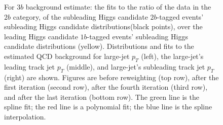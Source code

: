 \begin{figure}[htbp!]
\begin{center}
\caption{For $3b$ background estimate: the fits to the ratio of the data in the $2b$ category, of the subleading Higgs candidate $2b$-tagged events' subleading Higgs candidate distributions(black points), over the leading Higgs candidate $1b$-tagged events' subleading Higgs candidate distributions (yellow). Distributions and fits to the estimated QCD background for large-\R jet $p_{T}$ (left),  the large-\R jet's leading track jet $p_T$ (middle), and large-\R jet's subleading track jet $p_T$ (right) are shown.  Figures are before reweighting (top row), after the first iteration (second row), after the fourth iteration (third row), and after the last iteration (bottom row). The green line is the spline fit; the red line is a polynomial fit; the blue line is the spline interpolation.}
\label{fig:rw-3b-lead}
\end{center}
\end{figure}


